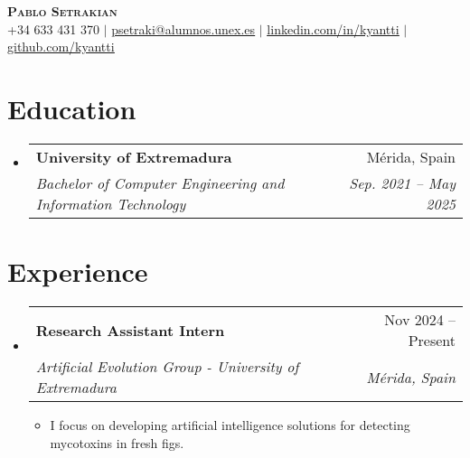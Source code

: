 \documentclass[letterpaper,11pt]{article}
\makeatletter
\newcommand{\resumeItem}[1]{
  \item\small{
    {#1 \vspace{-2pt}}
  }
}
\newcommand{\resumeSubheading}[4]{
  \vspace{-2pt}\item
    \begin{tabular*}{0.97\textwidth}[t]{l@{\extracolsep{\fill}}r}
      \textbf{#1} & #2 \\
      \textit{\small#3} & \textit{\small #4} \\
    \end{tabular*}\vspace{-7pt}
}
\newcommand{\resumeSubHeadingListStart}{\begin{itemize}[leftmargin=0.15in, label={}]}
\newcommand{\resumeSubHeadingListEnd}{\end{itemize}}
\newcommand{\resumeItemListStart}{\begin{itemize}}
\newcommand{\resumeItemListEnd}{\end{itemize}\vspace{-5pt}}
\makeatother
\begin{document}

\begin{center}
    \textbf{\Huge \scshape Pablo Setrakian} \\ \vspace{1pt}
    \small +34 633 431 370 $|$ \href{mailto:x@x.com}{\underline{psetraki@alumnos.unex.es}} $|$ 
    \href{https://linkedin.com/in/...}{\underline{linkedin.com/in/kyantti}} $|$
    \href{https://github.com/...}{\underline{github.com/kyantti}}
\end{center}


\section{Education}
  \resumeSubHeadingListStart
    \resumeSubheading
      {University of Extremadura}{Mérida, Spain}
      {Bachelor of Computer Engineering and Information Technology}{Sep. 2021 -- May 2025}
  \resumeSubHeadingListEnd


\section{Experience}
  \resumeSubHeadingListStart

    \resumeSubheading
      {Research Assistant Intern}{Nov 2024 -- Present}
      { Artificial Evolution Group - University of Extremadura}{Mérida, Spain}
      \resumeItemListStart
        \resumeItem{I focus on developing artificial intelligence solutions for detecting mycotoxins in fresh figs.}
      \resumeItemListEnd

  \resumeSubHeadingListEnd


\end{document}
